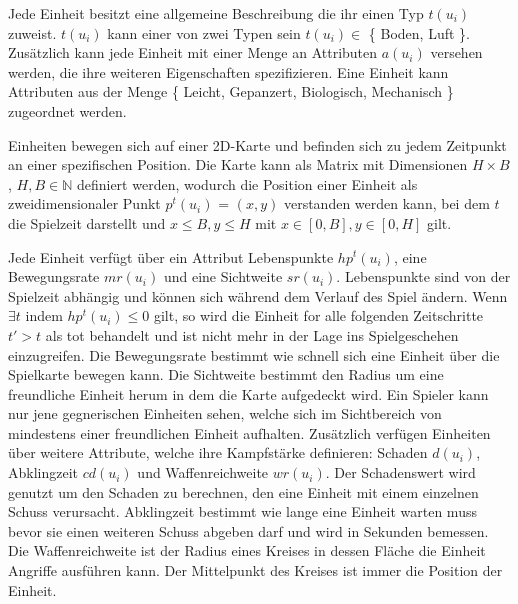 
Jede Einheit besitzt eine allgemeine Beschreibung die ihr einen Typ $t(u_i)$ zuweist. $t(u_i)$ kann einer von zwei Typen sein $t(u_i) \in$ \{ Boden, Luft \}. Zusätzlich kann jede Einheit mit einer Menge an Attributen $a(u_i)$ versehen werden, die ihre weiteren Eigenschaften spezifizieren. Eine Einheit kann Attributen aus der Menge \{ Leicht, Gepanzert, Biologisch, Mechanisch \}  zugeordnet werden.

Einheiten bewegen sich auf einer 2D-Karte und befinden sich zu jedem Zeitpunkt an einer spezifischen Position. Die Karte kann als Matrix mit Dimensionen $H \times B$, $H,B \in \mathbb{N}$ definiert werden, wodurch die Position einer Einheit als zweidimensionaler Punkt $p^t(u_i)$ = $(x,y)$ verstanden werden kann, bei dem $t$ die Spielzeit darstellt und $x \leq B, y \leq H$ mit $x \in [0,B], y \in [0,H]$ gilt.

Jede Einheit verfügt über ein Attribut Lebenspunkte $hp^t(u_i)$, eine Bewegungsrate $mr(u_i)$ und eine Sichtweite $sr(u_i)$. Lebenspunkte sind von der Spielzeit abhängig und können sich während dem Verlauf des Spiel ändern. Wenn $\exists t$ indem $hp^t(u_i) \leq 0$ gilt, so wird die Einheit for alle folgenden Zeitschritte $t' > t$ als tot behandelt und ist nicht mehr in der Lage ins Spielgeschehen einzugreifen. Die Bewegungsrate bestimmt wie schnell sich eine Einheit über die Spielkarte bewegen kann. Die Sichtweite bestimmt den Radius um eine freundliche Einheit herum in dem die Karte aufgedeckt wird. Ein Spieler kann nur jene gegnerischen Einheiten sehen, welche sich im Sichtbereich von mindestens einer freundlichen Einheit aufhalten. Zusätzlich verfügen Einheiten über weitere Attribute, welche ihre Kampfstärke definieren: Schaden $d(u_i)$, Abklingzeit $cd(u_i)$ und Waffenreichweite $wr(u_i)$. Der Schadenswert wird genutzt um den Schaden zu berechnen, den eine Einheit mit einem einzelnen Schuss verursacht. Abklingzeit bestimmt wie lange eine Einheit warten muss bevor sie einen weiteren Schuss abgeben darf und wird in Sekunden bemessen. Die Waffenreichweite ist der Radius eines Kreises in dessen Fläche die Einheit Angriffe ausführen kann. Der Mittelpunkt des Kreises ist immer die Position der Einheit. 

